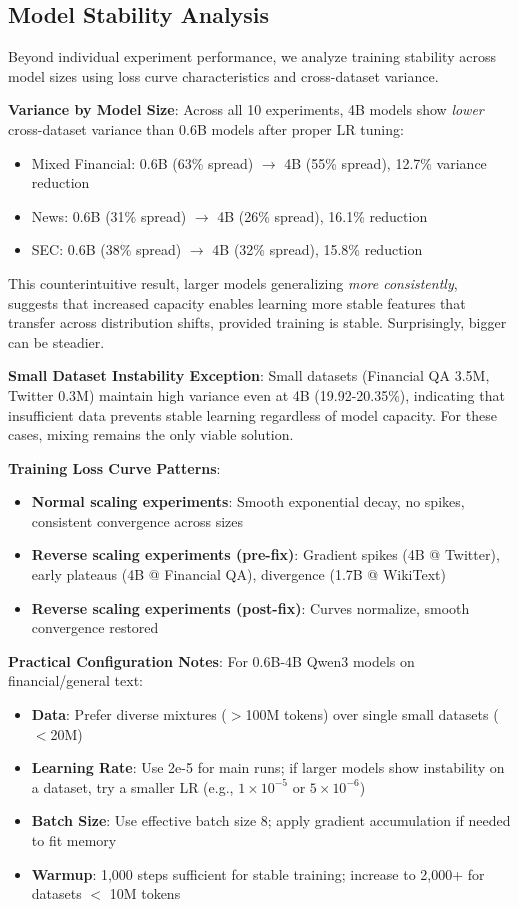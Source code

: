 \subsection{Model Stability Analysis}

Beyond individual experiment performance, we analyze training stability across model sizes using loss curve characteristics and cross-dataset variance.

\textbf{Variance by Model Size}: Across all 10 experiments, 4B models show \textit{lower} cross-dataset variance than 0.6B models after proper LR tuning:
\begin{itemize}
\item Mixed Financial: 0.6B (63\% spread) $\to$ 4B (55\% spread), 12.7\% variance reduction
\item News: 0.6B (31\% spread) $\to$ 4B (26\% spread), 16.1\% reduction
\item SEC: 0.6B (38\% spread) $\to$ 4B (32\% spread), 15.8\% reduction
\end{itemize}

This counterintuitive result, larger models generalizing \textit{more consistently}, suggests that increased capacity enables learning more stable features that transfer across distribution shifts, provided training is stable. Surprisingly, bigger can be steadier.

\textbf{Small Dataset Instability Exception}: Small datasets (Financial QA 3.5M, Twitter 0.3M) maintain high variance even at 4B (19.92-20.35\%), indicating that insufficient data prevents stable learning regardless of model capacity. For these cases, mixing remains the only viable solution.

\textbf{Training Loss Curve Patterns}:
\begin{itemize}
\item \textbf{Normal scaling experiments}: Smooth exponential decay, no spikes, consistent convergence across sizes
\item \textbf{Reverse scaling experiments (pre-fix)}: Gradient spikes (4B @ Twitter), early plateaus (4B @ Financial QA), divergence (1.7B @ WikiText)
\item \textbf{Reverse scaling experiments (post-fix)}: Curves normalize, smooth convergence restored
\end{itemize}

\textbf{Practical Configuration Notes}: For 0.6B-4B Qwen3 models on financial/general text:
\begin{itemize}
\item \textbf{Data}: Prefer diverse mixtures ($>$100M tokens) over single small datasets ($<$20M)
\item \textbf{Learning Rate}: Use 2e-5 for main runs; if larger models show instability on a dataset, try a smaller LR (e.g., $1\times10^{-5}$ or $5\times10^{-6}$)
\item \textbf{Batch Size}: Use effective batch size 8; apply gradient accumulation if needed to fit memory
\item \textbf{Warmup}: 1,000 steps sufficient for stable training; increase to 2,000+ for datasets $<$ 10M tokens
\end{itemize}

